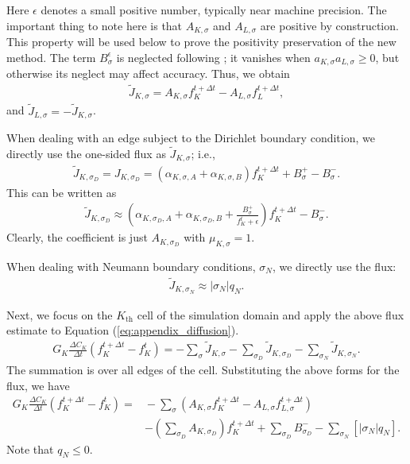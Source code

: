 \documentclass[11pt]{article}
\begin{document}
Here $\epsilon$ denotes a small positive number, typically near machine precision. The important thing to note here is that $A_{K,\sigma}$ and $A_{L,\sigma}$ are positive by construction. This property will be used below to prove the positivity preservation of the new method. The term $B_{\sigma}^{\epsilon}$ is neglected following ;
it vanishes when $a_{K,\sigma}a_{L,\sigma}\geq 0$, but otherwise its
neglect may affect accuracy. Thus, we obtain
  \begin{align}
    \label{JKL_inner}
    \tilde{J}_{K,\sigma} = A_{K,\sigma} f_K^{t+\Delta t} - A_{L,\sigma}f_L^{t+\Delta t},
  \end{align}
and $\tilde{J}_{L,\sigma} = -\tilde{J}_{K,\sigma}$. 

When dealing with an edge subject to the Dirichlet boundary condition, we directly use the one-sided flux as $\tilde{J}_{K,\sigma}$; i.e.,  
  \begin{align}
    \label{JKL_boundary}
    \tilde{J}_{K,\sigma_{D}} = J_{K,\sigma_{D}} = (\alpha_{K,\sigma,A} + \alpha_{K,\sigma,B})f_K^{t+\Delta t} + B_{\sigma}^+ - B_{\sigma}^-.
  \end{align}
  This can be written as 
  \begin{align}
     \tilde{J}_{K,\sigma_{D}} \approx \left(\alpha_{K,\sigma_{D},A} + \alpha_{K,\sigma_{D},B} + \frac{B_{\sigma}^{+}}{f_{K}^{t}+\epsilon}\right) f_K^{t+\Delta t} - B_{\sigma}^-.
  \end{align}
  Clearly, the coefficient is just $A_{K, \sigma_D}$ with $\mu_{K,\sigma}=1$. 

When dealing with Neumann boundary conditions, $\sigma_{N}$, we directly use the
flux:
\begin{align}
   \tilde{J}_{K,\sigma_{N}} \approx |\sigma_{N}| q_{N}.
\end{align}

Next, we focus on the $K_{\text{th}}$ cell of the simulation domain and apply the above flux estimate to Equation (\ref{eq:appendix_diffusion}).   
\begin{align}
    G_{K} \frac{\Delta C_{K}}{\Delta t} (f^{t+\Delta t}_{K} - f^{t}_{K}) = -\sum\limits_{\sigma} \tilde{J}_{K,\sigma} - \sum_{\sigma_{D}} \tilde{J}_{K,\sigma_{D}} - \sum_{\sigma_{N}}\tilde{J}_{K,\sigma_{N}}.
  \end{align}
The summation is over all edges of the cell. Substituting the above forms
for the flux, we have 
\begin{align}
  G_{K} \frac{\Delta C_{K}}{\Delta t} (f^{t+\Delta t}_{K} - f^{t}_{K}) = &{}-\sum_{\sigma} \left(A_{K,\sigma} f^{t+\Delta t}_{K} - A_{L,\sigma} f^{t+\Delta t}_{L,\sigma}\right)  \\
  &- \left(\sum_{\sigma_{D}}A_{K,\sigma_{D}}\right) f_{K}^{t+\Delta t} + \sum_{\sigma_{D}} B_{\sigma_{D}}^{-} - \sum_{\sigma_{N}} \left[|\sigma_{N}| q_{N}\right].
\end{align}
Note that $q_{N} \leq 0$.
\end{document}
